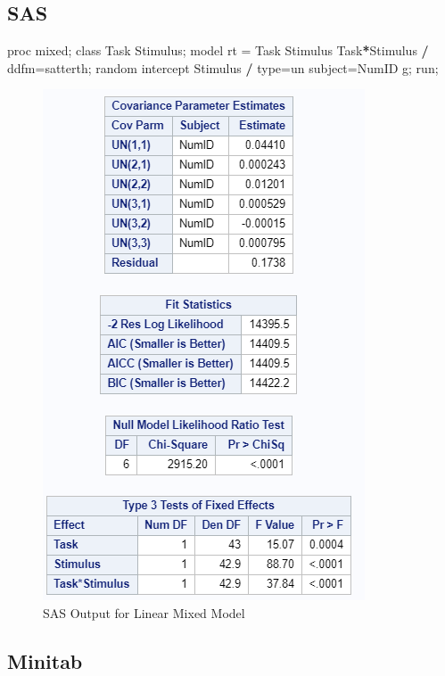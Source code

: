 \documentclass[
]{book}
\newenvironment{Shaded}{\begin{snugshade}}{\end{snugshade}}
\newcommand{\NormalTok}[1]{#1}
\newcommand{\OperatorTok}[1]{\textcolor[rgb]{0.81,0.36,0.00}{\textbf{#1}}}
\newcommand{\StringTok}[1]{\textcolor[rgb]{0.31,0.60,0.02}{#1}}
\begin{document}
\hypertarget{sas}{%
\subsection{SAS}\label{sas}}

\begin{Shaded}
\begin{Highlighting}[]
\NormalTok{proc mixed;}
\NormalTok{class Task Stimulus;}
\NormalTok{model rt =}\StringTok{ }\NormalTok{Task Stimulus Task}\OperatorTok{*}\NormalTok{Stimulus }\OperatorTok{/}\StringTok{ }\NormalTok{ddfm=satterth;}
\NormalTok{random intercept Stimulus }\OperatorTok{/}\StringTok{ }\NormalTok{type=un subject=NumID g;}
\NormalTok{run;}
\end{Highlighting}
\end{Shaded}

\begin{figure}[!h]
\includegraphics{Screenshots/Linear Mixed Model/lmmSAS} \caption{\label{fig:lmmSAS}SAS Output for Linear Mixed Model}\label{fig:lmmSAS}
\end{figure}

\hypertarget{minitab}{%
\subsection{Minitab}\label{minitab}}
\end{document}
